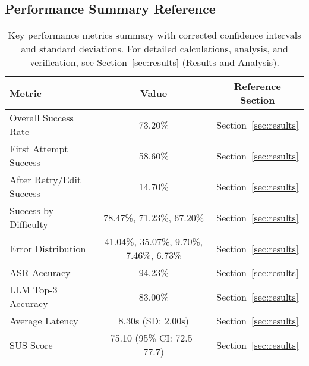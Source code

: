 \documentclass[a4paper,12pt]{article}
\begin{document}
\subsection{Performance Summary Reference}
\begin{table}[h!]
\centering
\begin{tabular}{|l|c|c|}
\hline
\textbf{Metric} & \textbf{Value} & \textbf{Reference Section} \\
\hline
Overall Success Rate & 73.20\% & Section~\ref{sec:results} \\
First Attempt Success & 58.60\% & Section~\ref{sec:results} \\
After Retry/Edit Success & 14.70\% & Section~\ref{sec:results} \\
Success by Difficulty & 78.47\%, 71.23\%, 67.20\% & Section~\ref{sec:results} \\
Error Distribution & 41.04\%, 35.07\%, 9.70\%, 7.46\%, 6.73\% & Section~\ref{sec:results} \\
ASR Accuracy & 94.23\% & Section~\ref{sec:results} \\
LLM Top-3 Accuracy & 83.00\% & Section~\ref{sec:results} \\
Average Latency & 8.30s (SD: 2.00s) & Section~\ref{sec:results} \\
SUS Score & 75.10 (95\% CI: 72.5–77.7) & Section~\ref{sec:results} \\
\hline
\end{tabular}
\caption{Key performance metrics summary with corrected confidence intervals and standard deviations. For detailed calculations, analysis, and verification, see Section~\ref{sec:results} (Results and Analysis).}
\end{table}
\end{document}
